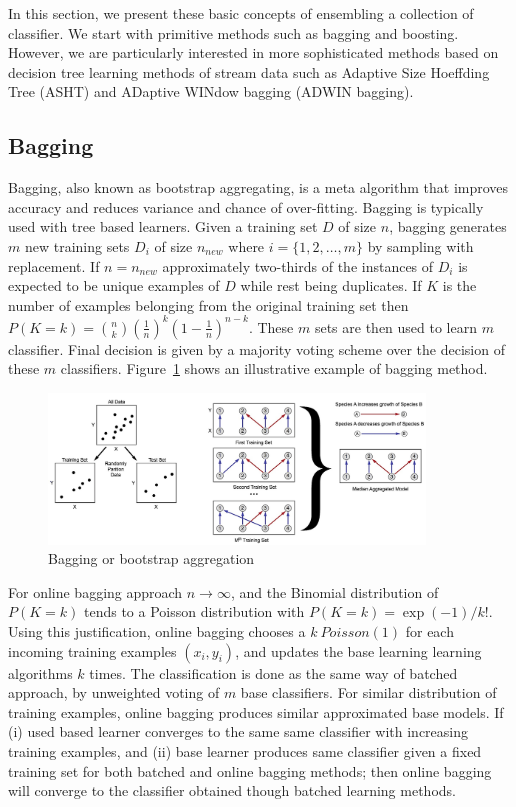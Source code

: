 \documentclass[a4paper, 11pt, oneside]{book}
\begin{document}
In this section, we present these basic concepts of ensembling a collection of classifier. We start with primitive methods such as bagging and boosting. However, we are particularly interested in more sophisticated methods based on decision tree learning methods of stream data such as Adaptive Size Hoeffding Tree (ASHT) and ADaptive WINdow bagging (ADWIN bagging).

\subsection{Bagging}
\label{sec:bg:bagging}
Bagging, also known as bootstrap aggregating, is a meta algorithm that improves accuracy and reduces variance and chance of over-fitting. Bagging is typically used with tree based learners. Given a training set $D$ of size $n$, bagging generates $m$ new training sets $D_i$ of size $n_{new}$ where $i = \{1, 2, \dots, m\}$ by sampling with replacement. If $n = n_{new}$ approximately two-thirds of the instances of $D_i$ is expected to be unique examples of $D$ while rest being duplicates. If $K$ is the number of examples belonging from the original training set then $P(K=k) = \binom{n}{k} \left( \frac{1}{n}\right)^k \left(1- \frac{1}{n}\right)^{n-k}$. These $m$ sets are then used to learn $m$ classifier. Final decision is given by a majority voting scheme over the decision of these $m$ classifiers. Figure~\ref{fig:bg:bagging} shows an illustrative example of bagging method.
\begin{figure}[htbp]
    \begin{center}
        \includegraphics[width=10.0cm]{figs/bagging.jpg}
        \caption{Bagging or bootstrap aggregation}
        \label{fig:bg:bagging}
    \end{center}
\end{figure}

For online bagging approach $n \rightarrow \infty$, and the Binomial distribution of $P(K=k)$ tends to a Poisson distribution with $P(K=k) = \exp(-1)/k!$. Using this justification, online bagging chooses a $k ~ Poisson(1)$ for each incoming training examples $(x_i, y_i)$, and updates the base learning learning algorithms $k$ times. The classification is done as the same way of batched approach, by unweighted voting of $m$ base classifiers. For similar distribution of training examples, online bagging produces similar approximated base models. If (i) used based learner converges to the same same classifier with increasing training examples, and (ii) base learner produces same classifier given a fixed training set for both batched and online bagging methods; then online bagging will converge to the classifier obtained though batched learning methods.
\end{document}
